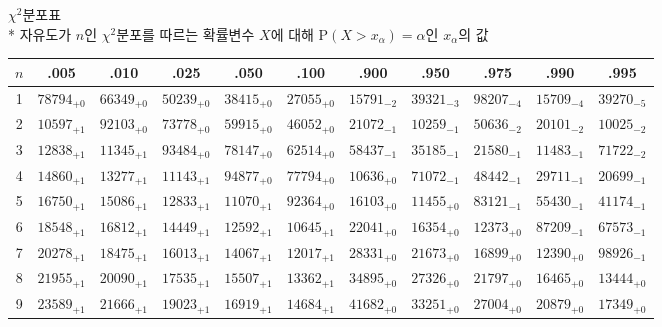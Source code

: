 \documentclass[10pt, a4paper]{article}
\begin{document}
\begin{center}
    \huge{\(\chi^{2}분포표\)}\normalsize\\
    * 자유도가 \(n\)인 \(\chi^2\)분포를 따르는 확률변수 \(X\)에 대해 \(\mathrm{P}\left(X > x_\alpha\right) = \alpha\)인 \(x_\alpha\)의 값\\
    \begin{longtable}{c || c c c c c | c c c c c}
        \(n\) & .005 & .010 & .025 & .050 & .100 & .900 & .950 & .975 & .990 & .995\\
        \hline\hline
        1 & \({78794}_{+0}\) & \({66349}_{+0}\) & \({50239}_{+0}\) & \({38415}_{+0}\) & \({27055}_{+0}\) & \({15791}_{-2}\) & \({39321}_{-3}\) & \({98207}_{-4}\) & \({15709}_{-4}\) & \({39270}_{-5}\)\\
        2 & \({10597}_{+1}\) & \({92103}_{+0}\) & \({73778}_{+0}\) & \({59915}_{+0}\) & \({46052}_{+0}\) & \({21072}_{-1}\) & \({10259}_{-1}\) & \({50636}_{-2}\) & \({20101}_{-2}\) & \({10025}_{-2}\)\\
        3 & \({12838}_{+1}\) & \({11345}_{+1}\) & \({93484}_{+0}\) & \({78147}_{+0}\) & \({62514}_{+0}\) & \({58437}_{-1}\) & \({35185}_{-1}\) & \({21580}_{-1}\) & \({11483}_{-1}\) & \({71722}_{-2}\)\\
        4 & \({14860}_{+1}\) & \({13277}_{+1}\) & \({11143}_{+1}\) & \({94877}_{+0}\) & \({77794}_{+0}\) & \({10636}_{+0}\) & \({71072}_{-1}\) & \({48442}_{-1}\) & \({29711}_{-1}\) & \({20699}_{-1}\)\\
        5 & \({16750}_{+1}\) & \({15086}_{+1}\) & \({12833}_{+1}\) & \({11070}_{+1}\) & \({92364}_{+0}\) & \({16103}_{+0}\) & \({11455}_{+0}\) & \({83121}_{-1}\) & \({55430}_{-1}\) & \({41174}_{-1}\)\\
        \hline
        6 & \({18548}_{+1}\) & \({16812}_{+1}\) & \({14449}_{+1}\) & \({12592}_{+1}\) & \({10645}_{+1}\) & \({22041}_{+0}\) & \({16354}_{+0}\) & \({12373}_{+0}\) & \({87209}_{-1}\) & \({67573}_{-1}\)\\
        7 & \({20278}_{+1}\) & \({18475}_{+1}\) & \({16013}_{+1}\) & \({14067}_{+1}\) & \({12017}_{+1}\) & \({28331}_{+0}\) & \({21673}_{+0}\) & \({16899}_{+0}\) & \({12390}_{+0}\) & \({98926}_{-1}\)\\
        8 & \({21955}_{+1}\) & \({20090}_{+1}\) & \({17535}_{+1}\) & \({15507}_{+1}\) & \({13362}_{+1}\) & \({34895}_{+0}\) & \({27326}_{+0}\) & \({21797}_{+0}\) & \({16465}_{+0}\) & \({13444}_{+0}\)\\
        9 & \({23589}_{+1}\) & \({21666}_{+1}\) & \({19023}_{+1}\) & \({16919}_{+1}\) & \({14684}_{+1}\) & \({41682}_{+0}\) & \({33251}_{+0}\) & \({27004}_{+0}\) & \({20879}_{+0}\) & \({17349}_{+0}\)\\

\end{longtable}
\end{center}
\end{document}

